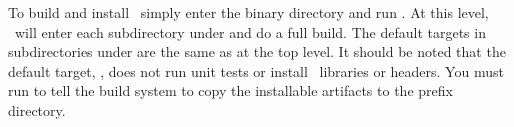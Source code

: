 To build and install \draco\ simply enter the  binary directory and run .  At this
level, \gmake\ will enter each subdirectory under  and do a full build.
The default targets in subdirectories under  are the same as at the top level.  It should be noted that the default target, , does not run unit tests or install \draco\ libraries or headers.  You must run  to tell the build system to copy the installable artifacts to the prefix directory.


